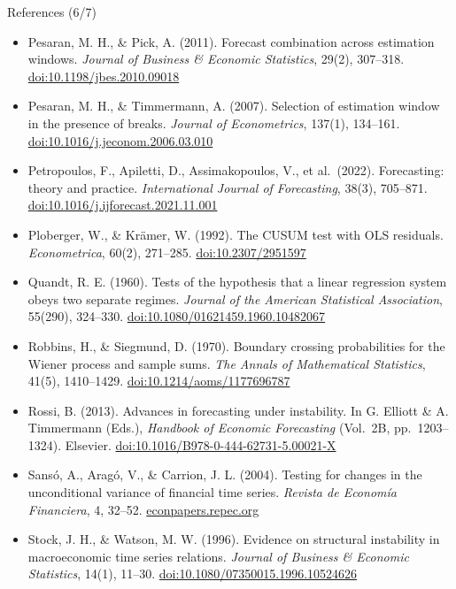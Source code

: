 \begin{frame}{References (6/7)}
\itemsize{\tiny}
\begin{itemize}
    \item Pesaran, M. H., \& Pick, A. (2011). Forecast combination across estimation windows. \textit{Journal of Business \& Economic Statistics}, 29(2), 307--318. \href{https://doi.org/10.1198/jbes.2010.09018}{doi:10.1198/jbes.2010.09018}
    \item Pesaran, M. H., \& Timmermann, A. (2007). Selection of estimation window in the presence of breaks. \textit{Journal of Econometrics}, 137(1), 134--161. \href{https://doi.org/10.1016/j.jeconom.2006.03.010}{doi:10.1016/j.jeconom.2006.03.010}
    \item Petropoulos, F., Apiletti, D., Assimakopoulos, V., et al.\ (2022). Forecasting: theory and practice. \textit{International Journal of Forecasting}, 38(3), 705--871. \href{https://doi.org/10.1016/j.ijforecast.2021.11.001}{doi:10.1016/j.ijforecast.2021.11.001}
    \item Ploberger, W., \& Krämer, W. (1992). The CUSUM test with OLS residuals. \textit{Econometrica}, 60(2), 271--285. \href{https://doi.org/10.2307/2951597}{doi:10.2307/2951597}
    \item Quandt, R. E. (1960). Tests of the hypothesis that a linear regression system obeys two separate regimes. \textit{Journal of the American Statistical Association}, 55(290), 324--330. \href{https://doi.org/10.1080/01621459.1960.10482067}{doi:10.1080/01621459.1960.10482067}
    \item Robbins, H., \& Siegmund, D. (1970). Boundary crossing probabilities for the Wiener process and sample sums. \textit{The Annals of Mathematical Statistics}, 41(5), 1410--1429. \href{https://doi.org/10.1214/aoms/1177696787}{doi:10.1214/aoms/1177696787}
    \item Rossi, B. (2013). Advances in forecasting under instability. In G. Elliott \& A. Timmermann (Eds.), \textit{Handbook of Economic Forecasting} (Vol.\ 2B, pp.\ 1203--1324). Elsevier. \href{https://doi.org/10.1016/B978-0-444-62731-5.00021-X}{doi:10.1016/B978-0-444-62731-5.00021-X}
    \item Sansó, A., Aragó, V., \& Carrion, J. L. (2004). Testing for changes in the unconditional variance of financial time series. \textit{Revista de Economía Financiera}, 4, 32--52. \href{https://econpapers.repec.org/RePEc:ubi:deawps:5}{econpapers.repec.org}
    \item Stock, J. H., \& Watson, M. W. (1996). Evidence on structural instability in macroeconomic time series relations. \textit{Journal of Business \& Economic Statistics}, 14(1), 11--30. \href{https://doi.org/10.1080/07350015.1996.10524626}{doi:10.1080/07350015.1996.10524626}

\end{itemize}
\end{frame}
